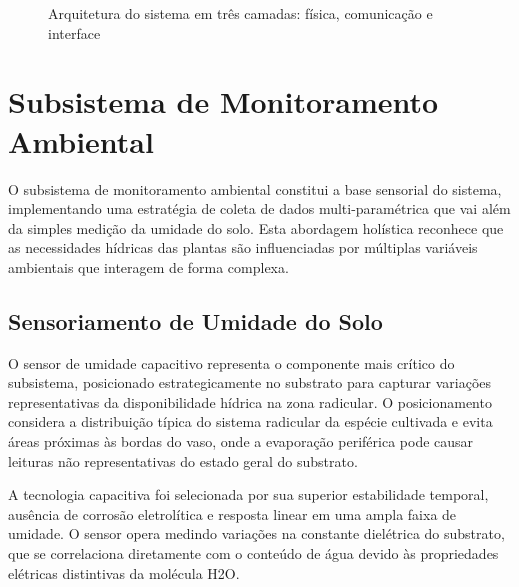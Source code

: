 \documentclass[twoside,english,brazilian]{UNISINOSmonografia}
\begin{document}
\begin{figure}[htbp]
\centering
\caption{Arquitetura do sistema em três camadas: física, comunicação e interface}
\label{fig:arquitetura_sistema}
\end{figure}

\section{Subsistema de Monitoramento Ambiental}

O subsistema de monitoramento ambiental constitui a base sensorial do sistema, implementando uma estratégia de coleta de dados multi-paramétrica que vai além da simples medição da umidade do solo. Esta abordagem holística reconhece que as necessidades hídricas das plantas são influenciadas por múltiplas variáveis ambientais que interagem de forma complexa.

\subsection{Sensoriamento de Umidade do Solo}

O sensor de umidade capacitivo representa o componente mais crítico do subsistema, posicionado estrategicamente no substrato para capturar variações representativas da disponibilidade hídrica na zona radicular. O posicionamento considera a distribuição típica do sistema radicular da espécie cultivada e evita áreas próximas às bordas do vaso, onde a evaporação periférica pode causar leituras não representativas do estado geral do substrato.

A tecnologia capacitiva foi selecionada por sua superior estabilidade temporal, ausência de corrosão eletrolítica e resposta linear em uma ampla faixa de umidade. O sensor opera medindo variações na constante dielétrica do substrato, que se correlaciona diretamente com o conteúdo de água devido às propriedades elétricas distintivas da molécula H2O.
\end{document}
